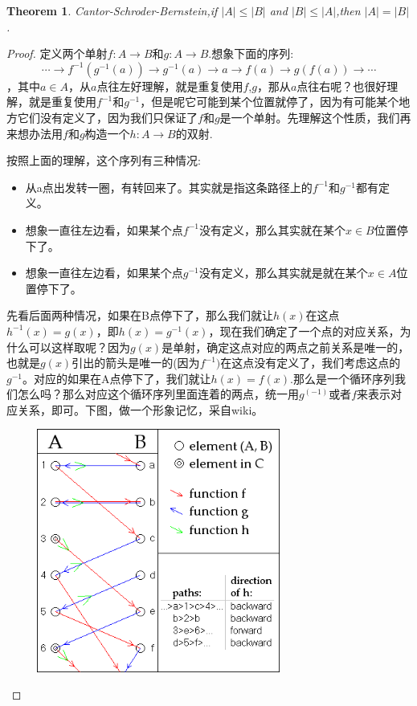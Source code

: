 \documentclass{article}
\newtheorem{theorem}{Theorem}[section]
\newcommand*{\xfunc}[4]{{#2}\colon{#3}{#1}{#4}}
\newcommand*{\func}[3]{\xfunc{\to}{#1}{#2}{#3}}
\begin{document}
\begin{theorem}
Cantor-Schroder-Bernstein,if $|A|\leq|B|$ and $|B|\leq |A|$,then $|A|=|B|$.
\end{theorem}

\begin{proof}
定义两个单射$\func{f}{A}{B}$和$\func{g}{A}{B}$.想象下面的序列:\[\cdots \rightarrow  f^{-1}(g^{-1}(a)) \rightarrow g^{-1}(a) \rightarrow   a  \rightarrow  f(a) \rightarrow  g(f(a)) \rightarrow \cdots\]，其中$a \in A$，从$a$点往左好理解，就是重复使用$f$,$g$，那从$a$点往右呢？也很好理解，就是重复使用$f^{-1}$和$g^{-1}$，但是呢它可能到某个位置就停了，因为有可能某个地方它们没有定义了，因为我们只保证了$f$和$g$是一个单射。先理解这个性质，我们再来想办法用$f$和$g$构造一个$\func{h}{A}{B}$的双射.

按照上面的理解，这个序列有三种情况:
\begin{itemize}
	\item 从a点出发转一圈，有转回来了。其实就是指这条路径上的$f^{-1}$和$g^{-1}$都有定义。
	\item 想象一直往左边看，如果某个点$f^{-1}$没有定义，那么其实就在某个$x \in B$位置停下了。
	\item 想象一直往左边看，如果某个点$g^{-1}$没有定义，那么其实就是就在某个$x \in A$位置停下了。	
\end{itemize}

先看后面两种情况，如果在B点停下了，那么我们就让$h(x)$在这点$h^{-1}(x)=g(x)$，即$h(x)=g^{-1}(x)$，现在我们确定了一个点的对应关系，为什么可以这样取呢？因为$g(x)$是单射，确定这点对应的两点之前关系是唯一的，也就是$g(x)$引出的箭头是唯一的(因为$f^{-1})$在这点没有定义了，我们考虑这点的$g^{-1}$。对应的如果在A点停下了，我们就让$h(x)=f(x)$.那么是一个循环序列我们怎么吗？那么对应这个循环序列里面连着的两点，统一用$g^(-1)$或者$f$来表示对应关系，即可。下图，做一个形象记忆，采自wiki。

\begin{center}
\includegraphics[width=10cm, height=8cm]{images/Cantor-Bernstein.png}
\end{center}


\end{proof}
\end{document}
